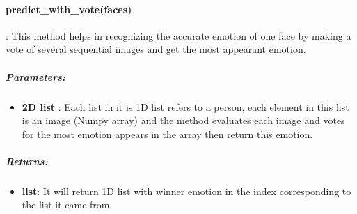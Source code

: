 \begin{comment}

\begin{itemize}
	\item call method:
	\begin{lstlisting}[language=Python]
	model.predict(faces, prob_emotion=False)\end{lstlisting}
\end{itemize}
\end{comment}

\paragraph{predict\_with\_vote(faces)}:
This method helps in recognizing the accurate emotion of one face by making a vote of several sequential images and get the most appearant emotion. \newline

\subparagraph{Parameters:}
\begin{changemargin}{0.5cm}{0cm}
\begin{itemize}
	\item \textbf{2D list }:\newline
	Each list in it is 1D list refers to a person, each element in this list is an image (Numpy array) and the method evaluates each image and votes for the most emotion appears in the array then return this emotion.
\end{itemize}
\end{changemargin}

\subparagraph{Returns:}
\begin{changemargin}{0.5cm}{0cm}
\begin{itemize}
	\item \textbf{list}:\newline
	It will return 1D list with winner emotion in the index corresponding to the list it came from.
\end{itemize}
\end{changemargin}

\begin{comment}
\subparagraph{Usage}:
\begin{changemargin}{0.5cm}{0cm}

\begin{itemize}
	\item call method:
	\begin{lstlisting}[language=Python]
	model.predict_with_vote(faces)\end{lstlisting}
\end{itemize}
\end{changemargin}
\end{comment}

